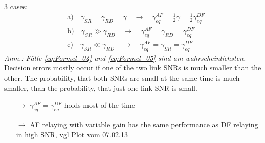 \documentclass[a4paper, 10pt]{article}
\begin{document}
\underline{3 cases:}
\begin{align}
	&\text{a)}\quad \gamma_{SR} = \gamma_{RD} = \gamma\quad \rightarrow \quad \gamma_{eq}^{AF} = \frac{1}{2}\gamma = \frac{1}{2}\gamma_{eq}^{DF}\label{eq:Formel_03} \\
	&\text{b)}\quad \gamma_{SR} \gg \gamma_{RD} \quad \rightarrow \quad \gamma_{eq}^{AF} = \gamma_{RD} = \gamma_{eq}^{DF}\label{eq:Formel_04} \\
	&\text{c)}\quad \gamma_{SR} \ll \gamma_{RD} \quad \rightarrow \quad \gamma_{eq}^{AF} = \gamma_{SR} = \gamma_{eq}^{DF}\label{eq:Formel_05}
\end{align}
\textit{Anm.: F\"alle \ref{eq:Formel_04} und \ref{eq:Formel_05} sind am wahrscheinlichsten.}
Decision errors mostly occur if one of the two link SNRs is much smaller than the other. The probability, that both SNRs are small at the same time is much smaller, than the probability, that just one link SNR is small. 
\begin{itemize}
	\item[$\rightarrow$] $\gamma_{eq}^{AF} = \gamma_{eq}^{DF} $ holds most of the time
	\item[$\rightarrow$] AF relaying with variable gain has the same performance as DF relaying in high SNR, vgl Plot vom 07.02.13
\end{itemize}
\end{document}
